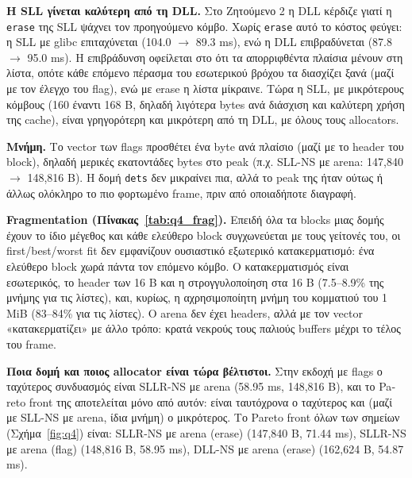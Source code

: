 \documentclass[11pt,a4paper]{article}
\newcommand{\en}[1]{\textlatin{#1}}
\begin{document}
\textbf{Η \en{SLL} γίνεται καλύτερη από τη \en{DLL}.} Στο Ζητούμενο 2 η \en{DLL} κέρδιζε γιατί η \en{\texttt{erase}} της \en{SLL} ψάχνει τον προηγούμενο κόμβο. Χωρίς \en{\texttt{erase}} αυτό το κόστος φεύγει: η \en{SLL} με \en{glibc} επιταχύνεται (104.0 $\rightarrow$ 89.3 \en{ms}), ενώ η \en{DLL} επιβραδύνεται (87.8 $\rightarrow$ 95.0 \en{ms}). Η επιβράδυνση οφείλεται στο ότι τα απορριφθέντα πλαίσια μένουν στη λίστα, οπότε κάθε επόμενο πέρασμα του εσωτερικού βρόχου τα διασχίζει ξανά (μαζί με τον έλεγχο του \en{flag}), ενώ με \en{erase} η λίστα μίκραινε. Τώρα η \en{SLL}, με μικρότερους κόμβους (160 έναντι 168 \en{B}, δηλαδή λιγότερα \en{bytes} ανά διάσχιση και καλύτερη χρήση της \en{cache}), είναι γρηγορότερη και μικρότερη από τη \en{DLL}, με όλους τους \en{allocators}.

\textbf{Μνήμη.} Το \en{vector} των \en{flags} προσθέτει ένα \en{byte} ανά πλαίσιο (μαζί με το \en{header} του \en{block}), δηλαδή μερικές εκατοντάδες \en{bytes} στο \en{peak} (π.χ. \en{SLL-NS} με \en{arena}: 147{,}840 $\rightarrow$ 148{,}816 \en{B}). Η δομή \en{\texttt{dets}} δεν μικραίνει πια, αλλά το \en{peak} της ήταν ούτως ή άλλως ολόκληρο το πιο φορτωμένο \en{frame}, πριν από οποιαδήποτε διαγραφή.

\textbf{\en{Fragmentation} (Πίνακας~\ref{tab:q4_frag}).} Επειδή όλα τα \en{blocks} μιας δομής έχουν το ίδιο μέγεθος και κάθε ελεύθερο \en{block} συγχωνεύεται με τους γείτονές του, οι \en{first/best/worst fit} δεν εμφανίζουν ουσιαστικό εξωτερικό κατακερματισμό: ένα ελεύθερο \en{block} χωρά πάντα τον επόμενο κόμβο. Ο κατακερματισμός είναι εσωτερικός, το \en{header} των 16 \en{B} και η στρογγυλοποίηση στα 16 \en{B} (7.5--8.9\% της μνήμης για τις λίστες), και, κυρίως, η αχρησιμοποίητη μνήμη του κομματιού του 1 \en{MiB} (83--84\% για τις λίστες). Ο \en{arena} δεν έχει \en{headers}, αλλά με τον \en{vector} «κατακερματίζει» με άλλο τρόπο: κρατά νεκρούς τους παλιούς \en{buffers} μέχρι το τέλος του \en{frame}.

\textbf{Ποια δομή και ποιος \en{allocator} είναι τώρα βέλτιστοι.} Στην εκδοχή με \en{flags} ο ταχύτερος συνδυασμός είναι \en{SLLR-NS} με \en{arena} (58.95 \en{ms}, 148{,}816 \en{B}), και το \en{Pareto front} της αποτελείται μόνο από αυτόν: είναι ταυτόχρονα ο ταχύτερος και (μαζί με \en{SLL-NS} με \en{arena}, ίδια μνήμη) ο μικρότερος. Το \en{Pareto front} όλων των σημείων (Σχήμα~\ref{fig:q4}) είναι: \en{SLLR-NS} με \en{arena} (\en{erase}) (147{,}840 \en{B}, 71.44 \en{ms}), \en{SLLR-NS} με \en{arena} (\en{flag}) (148{,}816 \en{B}, 58.95 \en{ms}), \en{DLL-NS} με \en{arena} (\en{erase}) (162{,}624 \en{B}, 54.87 \en{ms}).
\end{document}
